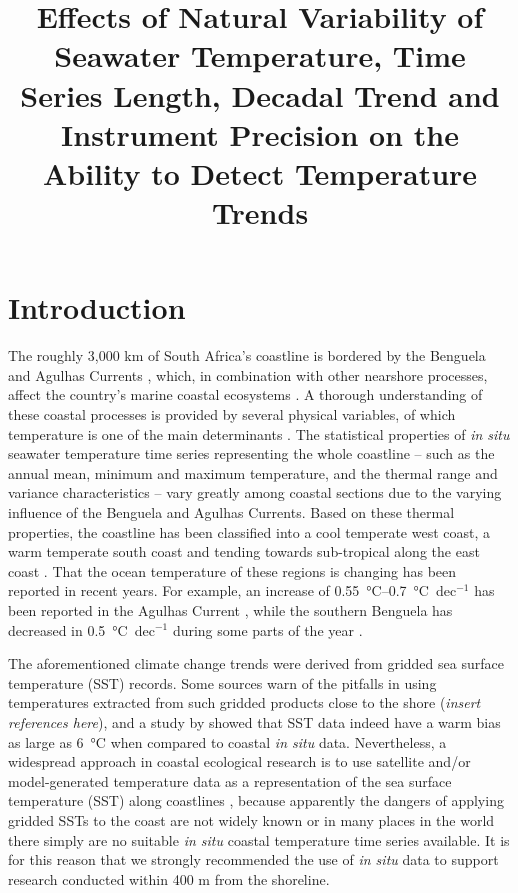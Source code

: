 \documentclass[]{ametsoc}
\title{Effects of Natural Variability of Seawater Temperature, Time Series Length, Decadal Trend and Instrument Precision on the Ability to Detect Temperature Trends}
\affiliation{Department of Biodiversity and Conservation Biology, University of the Western Cape, Bellville, Republic of South Africa}
\begin{document}
\maketitle

\section{Introduction}
The roughly 3,000 km of South Africa's coastline is bordered by the Benguela and Agulhas Currents \citep[\emph{e.g.}][]{Roberts2005,Hutchings2009}, which, in combination with other nearshore processes, affect the country's marine coastal ecosystems \citep{Santos2012a}. A thorough understanding of these coastal processes is provided by several physical variables, of which temperature is one of the main determinants \citep[\emph{e.g.}][]{Blanchette2008, Tittensor2010, Couce2012}. The statistical properties of \emph{in situ} seawater temperature time series representing the whole coastline -- such as the annual mean, minimum and maximum temperature, and the thermal range and variance characteristics -- vary greatly among coastal sections due to the varying influence of the Benguela and Agulhas Currents. Based on these thermal properties, the coastline has been classified into a cool temperate west coast, a warm temperate south coast and tending towards sub-tropical along the east coast \citep{Smit2013,Mead2013}. That the ocean temperature of these regions is changing has been reported in recent years. For example, an increase of \SIrange{0.55}{0.7}{\degreeCelsius}~dec$^{-1}$ has been reported in the Agulhas Current \citep{Rouault2009,Rouault2010}, while the southern Benguela has decreased in \SI{0.5}{\degreeCelsius}~dec$^{-1}$ during some parts of the year \citep{Rouault2010}.

The aforementioned climate change trends were derived from gridded sea surface temperature (SST) records. Some sources warn of the pitfalls in using temperatures extracted from such gridded products close to the shore (\emph{insert references here}), and a study by \citet{Smit2013} showed that SST data indeed have a warm bias as large as \SI{6}{\degreeCelsius} when compared to coastal \emph{in situ} data. Nevertheless, a widespread approach in coastal ecological research is to use satellite and/or model-generated temperature data as a representation of the sea surface temperature (SST) along coastlines \citep[\emph{e.g.}][]{Blanchette2008, Broitman2008a, Tyberghein2012}, because apparently the dangers of applying gridded SSTs to the coast are not widely known or in many places in the world there simply are no suitable \emph{in situ} coastal temperature time series available. It is for this reason that we strongly recommended the use of \emph{in situ} data to support research conducted within 400 m from the shoreline.
\end{document}
